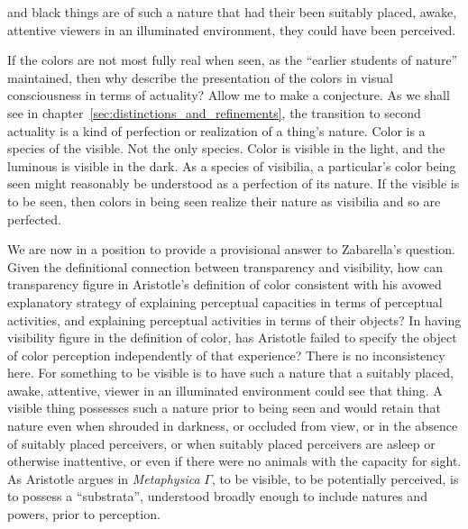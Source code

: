 and black things are of such a nature that had their been suitably placed, awake, attentive viewers in an illuminated environment, they could have been perceived.

If the colors are not most fully real when seen, as the ``earlier students of nature'' maintained, then why describe the presentation of the colors in visual consciousness in terms of actuality? Allow me to make a conjecture. As we shall see in chapter~\ref{sec:distinctions_and_refinements}, the transition to second actuality is a kind of perfection or realization of a thing's nature. Color is a species of the visible. Not the only species. Color is visible in the light, and the luminous is visible in the dark. As a species of visibilia, a particular's color being seen might reasonably be understood as a perfection of its nature. If the visible is to be seen, then colors in being seen realize their nature as visibilia and so are perfected.

We are now in a position to provide a provisional answer to Zabarella's question. Given the definitional connection between transparency and visibility, how can transparency figure in Aristotle's definition of color consistent with his avowed explanatory strategy of explaining perceptual capacities in terms of perceptual activities, and explaining perceptual activities in terms of their objects? In having visibility figure in the definition of color, has Aristotle failed to specify the object of color perception independently of that experience? There is no inconsistency here. For something to be visible is to have such a nature that a suitably placed, awake, attentive, viewer in an illuminated environment could see that thing. A visible thing possesses such a nature prior to being seen and would retain that nature even when shrouded in darkness, or occluded from view, or in the absence of suitably placed perceivers, or when suitably placed perceivers are asleep or otherwise inattentive, or even if there were no animals with the capacity for sight. As Aristotle argues in \emph{Metaphysica} \( \Gamma \), to be visible, to be potentially perceived, is to possess a ``substrata'', understood broadly enough to include natures and powers, prior to perception.


